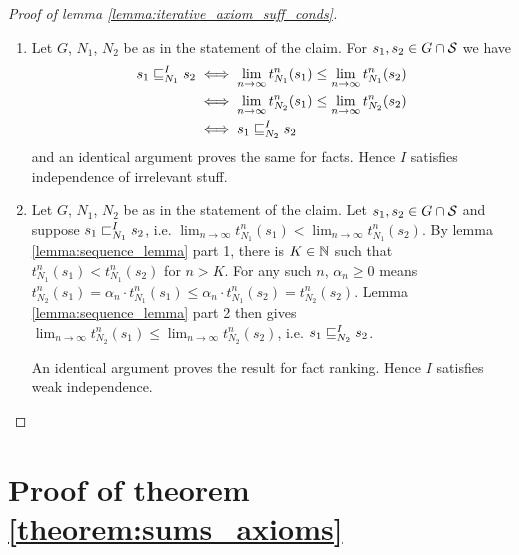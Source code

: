 \documentclass[../main.tex]{subfiles}
\begin{document}
\begin{proof}[Proof of lemma \ref{lemma:iterative_axiom_suff_conds}]
\begin{enumerate}
\item Let $G$, $N_1$, $N_2$ be as in the statement of the claim. For $s_1, s_2
\in G \cap \S$ we have
\begin{align*}
    s_1 \sle_{N_1}^I s_2
    & \iff \lim_{n \rightarrow \infty}{t_{N_1}^n(s_1)} \le \lim_{n \rightarrow
        \infty}{t_{N_1}^n(s_2)} \\
    & \iff \lim_{n \rightarrow \infty}{t_{N_2}^n(s_1)} \le \lim_{n \rightarrow
        \infty}{t_{N_2}^n(s_2)} \\
    & \iff s_1 \sle_{N_2}^I s_2
\end{align*}
and an identical argument proves the same for facts. Hence $I$ satisfies
independence of irrelevant stuff.

\item Let $G$, $N_1$, $N_2$ be as in the statement of the claim. Let $s_1, s_2
\in G \cap \S$ and suppose $s_1 \slt_{N_1}^I s_2$, i.e. $\lim_{n \rightarrow
\infty}{t_{N_1}^n(s_1)} < \lim_{n \rightarrow \infty}{t_{N_1}^n(s_2)}$. By
lemma \ref{lemma:sequence_lemma} part 1, there is $K \in \Nat$ such that
$t_{N_1}^n(s_1) < t_{N_1}^n(s_2)$ for $n > K$. For any such $n$, $\alpha_n \ge
0$ means $t_{N_2}^n(s_1) = \alpha_n \cdot t_{N_1}^n(s_1) \le \alpha_n \cdot
t_{N_1}^n(s_2) = t_{N_2}^n(s_2)$. Lemma \ref{lemma:sequence_lemma} part 2 then
gives $\lim_{n \rightarrow \infty}t_{N_2}^n(s_1) \le \lim_{n \rightarrow
\infty}t_{N_2}^n(s_2)$, i.e. $s_1 \sle_{N_2}^I s_2$.

An identical argument proves the result for fact ranking. Hence $I$ satisfies
weak independence.
\end{enumerate}

\end{proof}

\section{Proof of theorem \ref{theorem:sums_axioms}}
\end{document}
